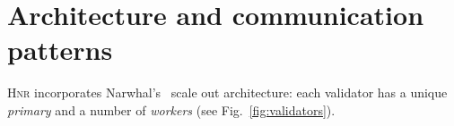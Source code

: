 \documentclass[%
dvipsnames,handout]{article}
\theoremstyle{definition}
\newcommand{\Hnr}{\textsc{Hnr}\xspace}
\newcommand{\fig}[1][]{Fig.~}
\begin{document}






\section{Architecture and communication patterns}
\label{sec:communication-patterns}
 \Hnr incorporates Narwhal's~\cite{NT}
 scale out architecture: %
 each validator has a unique \emph{primary} and %
 a number of \emph{workers} %
 (see \fig\ref{fig:validators}).
\end{document}
